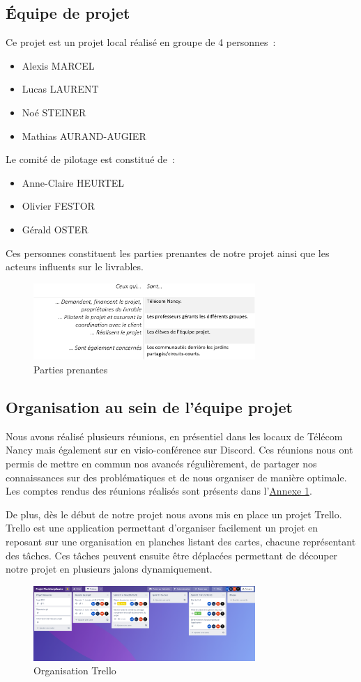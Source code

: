 \documentclass[french,a4paper]{article}
\begin{document}
\subsection{Équipe de projet}
Ce projet est un projet local réalisé en groupe de 4 personnes~:
\begin{itemize}
    \item Alexis MARCEL
    \item Lucas LAURENT
    \item Noé STEINER
    \item Mathias AURAND-AUGIER
\end{itemize}
Le comité de pilotage est constitué de~:
\begin{itemize}
    \item Anne-Claire HEURTEL
    \item Olivier FESTOR
    \item Gérald OSTER
\end{itemize}
Ces personnes constituent les parties prenantes de notre projet ainsi que les acteurs influents sur le livrables.
\begin{figure}[H]
    \centering
    \includegraphics[width=0.75\textwidth]{img/parties_prenantes.png}
    \caption{Parties prenantes}
\end{figure} 
\subsection{Organisation au sein de l’équipe projet}
Nous avons réalisé plusieurs réunions, en présentiel dans les locaux de Télécom Nancy mais également sur en visio-conférence sur Discord. Ces réunions nous ont permis de mettre en commun nos avancés régulièrement, de partager nos connaissances sur des problématiques et de nous organiser de manière optimale.
Les comptes rendus des réunions réalisés sont présents dans l’\hyperlink{annexe1}{Annexe 1}.

De plus, dès le début de notre projet nous avons mis en place un projet Trello. Trello est une application permettant d’organiser facilement un projet en reposant sur une organisation en planches listant des cartes, chacune représentant des tâches. Ces tâches peuvent ensuite être déplacées permettant de découper notre projet en plusieurs jalons dynamiquement.
\begin{figure}[H]
    \centering
    \includegraphics[width=0.75\textwidth]{img/trello.png}
    \caption{Organisation Trello}
\end{figure} 
\end{document}
